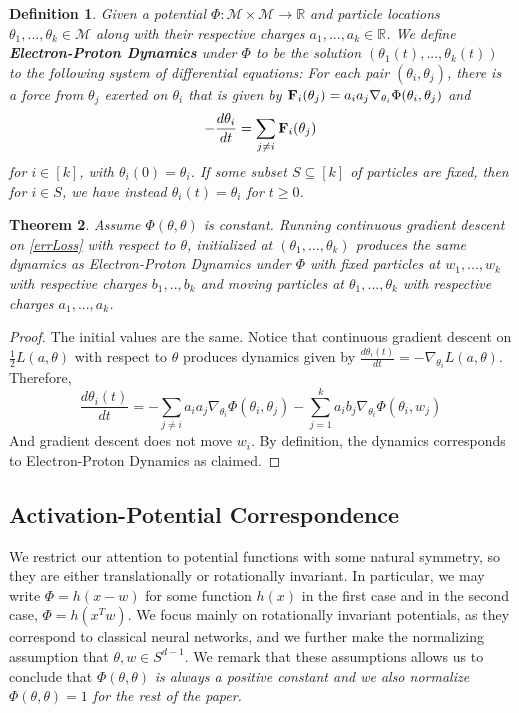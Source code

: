 \documentclass{article}
\newtheorem{theorem}{Theorem}[section]
\newtheorem{definition}[theorem]{Definition}
\newcommand{\R}{{\mathbb{R}}}
\begin{document}
\begin{definition}\label{EPDef}
Given a potential $\Phi : \mathcal{M} \times \mathcal{M} \to \R$ and particle locations $\theta_1,...,\theta_k \in \mathcal{M}$ along with their respective charges $a_1,...,a_k \in \R$. We define {\bf Electron-Proton Dynamics} under $\Phi$ to be the solution $(\theta_1(t),...,\theta_k(t))$ to the following system of differential equations: For each pair $(\theta_i,\theta_j)$, there is a force from $\theta_j$ exerted on $\theta_i$ that is given by ${\bf F}_{i}(\theta_j) = a_ia_j\nabla_{\theta_i} \Phi(\theta_i,\theta_j)$ and
\[-\frac{d\theta_i}{dt} =  \sum_{ j \neq i} {\bf F}_{i}(\theta_j)\]
for $i \in [k]$, with $\theta_i(0) = \theta_i$. If some subset $S \subseteq [k]$ of particles are fixed, then for $i\in S$, we have instead $\theta_i(t) = \theta_i$ for $t \geq 0$.

\end{definition}


\begin{theorem}\label{EPDyn}
Assume $\Phi(\theta, \theta)$ is constant. Running continuous gradient descent on \eqref{errLoss} with respect to $\theta$, initialized at $(\theta_1,...,\theta_k)$ produces the same dynamics as Electron-Proton Dynamics under $\Phi$ with fixed particles at $w_1,...,w_k$ with respective charges $b_1,..,b_k$ and moving particles at $\theta_1,...,\theta_k$ with respective charges $a_1,...,a_k$.
\end{theorem}

\begin{proof}
The initial values are the same. Notice that continuous gradient descent on $\frac{1}{2}L(a,\theta)$ with respect to $\theta$ produces dynamics given by $\frac{d\theta_i(t)}{dt} = -\nabla_{\theta_i}L(a,\theta)$. Therefore,
\[\frac{d\theta_i(t)}{dt} = -\sum_{j \neq i} a_i a_j \nabla_{\theta_i}\Phi(\theta_i,\theta_j) - \sum_{j=1}^k a_ib_j\nabla_{\theta_i} \Phi(\theta_i,w_j)\]
And gradient descent does not move $w_i$. By definition, the dynamics corresponds to Electron-Proton Dynamics as claimed.
\end{proof}

\subsection{Activation-Potential Correspondence}

We restrict our attention to potential functions with some natural symmetry, so they are either translationally or rotationally invariant. In particular, we may write $\Phi= h(x-w)$ for some function $h(x)$  in the first case and in the second case, $\Phi = h(x^Tw)$. We focus mainly on rotationally invariant potentials, as they correspond to classical neural networks, and we further make the normalizing assumption that $\theta, w \in S^{d-1}$. We remark that these assumptions allows us to conclude that $\Phi(\theta,\theta)$ {\it is always a positive constant and we also normalize $\Phi(\theta,\theta) = 1$ for the rest of the paper.}
\end{document}

